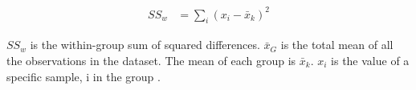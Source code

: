 \begin{equation}
\begin{aligned} SS_{w} &=\sum_i\left(x_{i}-\bar{x}_{k}\right)^{2} \end{aligned}
\end{equation}

$SS_w $ is the within-group sum of squared differences. $\bar x_G$ is the total mean of all the observations in the dataset. The mean of each group is $\bar x_k$.  $x_i$ is the value of a specific sample, i in the group \cite{anova}.







